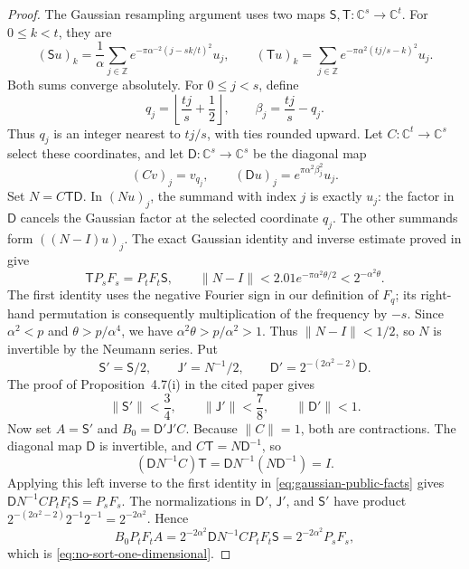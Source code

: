 \documentclass[11pt]{article}
\theoremstyle{definition}
\begin{document}
\begin{proof}
The Gaussian resampling argument uses two maps
$\mathsf S,\mathsf T:\mathbb C^s\to\mathbb C^t$. For $0\leq k<t$, they are
\[
 (\mathsf S u)_k=\frac1\alpha\sum_{j\in\mathbb Z}
 e^{-\pi\alpha^{-2}(j-sk/t)^2}u_j,
 \qquad
 (\mathsf T u)_k=\sum_{j\in\mathbb Z}
 e^{-\pi\alpha^2(tj/s-k)^2}u_j.
\]
Both sums converge absolutely. For $0\leq j<s$, define
\[
 q_j=\left\lfloor\frac{tj}{s}+\frac12\right\rfloor,
 \qquad \beta_j=\frac{tj}{s}-q_j.
\]
Thus $q_j$ is an integer nearest to $tj/s$, with ties rounded upward.
Let $C:\mathbb C^t\to\mathbb C^s$ select these coordinates, and let
$\mathsf D:\mathbb C^s\to\mathbb C^s$ be the diagonal map
\[
 (Cv)_j=v_{q_j},\qquad
 (\mathsf D u)_j=e^{\pi\alpha^2\beta_j^2}u_j.
\]
Set $N=C\mathsf T\mathsf D$. In $(Nu)_j$, the summand with index $j$
is exactly $u_j$: the factor in $\mathsf D$ cancels the Gaussian factor
at the selected coordinate $q_j$. The other summands form $((N-I)u)_j$.
The exact Gaussian identity and inverse estimate proved in
\cite[Theorem~4.2 and Lemma~4.6]{HarveyHoeven2021} give
\begin{equation}
 \mathsf T P_sF_s=P_tF_t\mathsf S,
 \qquad
 \|N-I\|<2.01e^{-\pi\alpha^2\theta/2}<2^{-\alpha^2\theta}.
 \label{eq:gaussian-public-facts}
\end{equation}
The first identity uses the negative Fourier sign in our definition of
$F_q$; its right-hand permutation is consequently multiplication of the
frequency by $-s$. Since $\alpha^2<p$ and $\theta>p/\alpha^4$, we have
$\alpha^2\theta>p/\alpha^2>1$. Thus $\|N-I\|<1/2$, so $N$ is invertible
by the Neumann series. Put
\[
 \mathsf S'=\mathsf S/2,\qquad
 \mathsf J'=N^{-1}/2,\qquad
 \mathsf D'=2^{-(2\alpha^2-2)}\mathsf D.
\]
The proof of Proposition~4.7(i) in the cited paper gives
\[
 \|\mathsf S'\|<\frac34,\qquad
 \|\mathsf J'\|<\frac78,\qquad
 \|\mathsf D'\|<1.
\]
Now set $A=\mathsf S'$ and $B_0=\mathsf D'\mathsf J'C$.
Because $\|C\|=1$, both are contractions. The diagonal map $\mathsf D$
is invertible, and $C\mathsf T=N\mathsf D^{-1}$, so
\[
 (\mathsf D N^{-1}C)\mathsf T
 =\mathsf D N^{-1}(N\mathsf D^{-1})=I.
\]
Applying this left inverse to the first identity in
\eqref{eq:gaussian-public-facts} gives
$\mathsf D N^{-1}CP_tF_t\mathsf S=P_sF_s$. The normalizations in
$\mathsf D'$, $\mathsf J'$, and $\mathsf S'$ have product
$2^{-(2\alpha^2-2)}2^{-1}2^{-1}=2^{-2\alpha^2}$. Hence
\[
 B_0P_tF_tA
 =2^{-2\alpha^2}\mathsf D N^{-1}CP_tF_t\mathsf S
 =2^{-2\alpha^2}P_sF_s,
\]
which is \eqref{eq:no-sort-one-dimensional}.


\end{proof}
\end{document}
